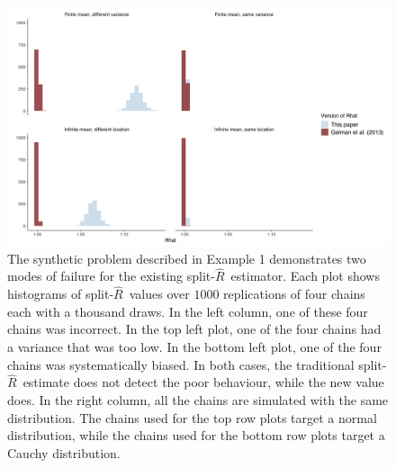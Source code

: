 \documentclass[american,]{article}
\newcommand{\sRhat}{split-$\widehat{R}$}
\theoremstyle{definition}
\begin{document}
\begin{figure}
\centering
\includegraphics[width=\textwidth]{graphics/simple_rhat_compare.png}
\caption{  The synthetic problem described in Example 1 demonstrates
two modes of failure for the existing \sRhat\ estimator. Each plot shows
histograms of \sRhat\ values over $1000$ replications of four chains each
with a thousand draws. In the left column, one of these four chains was 
incorrect. In the top left plot, one of the four chains had a variance that was too low.
In the bottom left plot, one of the four chains was systematically biased. 
In both cases, the traditional \sRhat\ estimate does not detect the poor
behaviour, while the new value does. In the right column, all the chains are
simulated with the same distribution. The chains used for the top row plots target 
a normal distribution, while the chains used for the bottom row plots target
a Cauchy distribution. \label{fig:simple_example}}
\end{figure}
\end{document}
